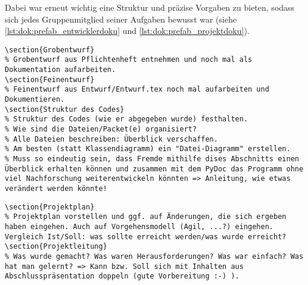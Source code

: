 Dabei war erneut wichtig eine Struktur und präzise Vorgaben zu bieten, sodass sich jedes Gruppenmitglied seiner Aufgaben bewusst war (siehe \autoref{lst:dok:prefab_entwicklerdoku} und \autoref{lst:dok:prefab_projektdoku}).

\begin{lstlisting}[language={[LaTeX]TeX}, label=lst:dok:prefab_entwicklerdoku, caption=Auszug der Vorlage der Entwicklerdokumentation]
% Anmerkung: Entwicklerdokumentation = Programmiererdokumentation (Pflichtenheft /DA2/)
\section{Grobentwurf}
% Grobentwurf aus Pflichtenheft entnehmen und noch mal als Dokumentation aufarbeiten.
\section{Feinentwurf}
% Feinentwurf aus Entwurf/Entwurf.tex noch mal aufarbeiten und Dokumentieren.
\section{Struktur des Codes}
% Struktur des Codes (wie er abgegeben wurde) festhalten. 
% Wie sind die Dateien/Packet(e) organisiert?
% Alle Dateien beschreiben: Überblick verschaffen.
% Am besten (statt Klassendiagramm) ein "Datei-Diagramm" erstellen.
% Muss so eindeutig sein, dass Fremde mithilfe dises Abschnitts einen Überblick erhalten können und zusammen mit dem PyDoc das Programm ohne viel Nachforschung weiterentwickeln könnten => Anleitung, wie etwas verändert werden könnte!
\end{lstlisting}

\begin{lstlisting}[language={[LaTeX]TeX}, label=lst:dok:prefab_projektdoku, caption=Auszug der Vorlage der Projektdokumentation]
\section{Projektplan}
% Projektplan vorstellen und ggf. auf Änderungen, die sich ergeben haben eingehen. Auch auf Vorgehensmodell (Agil, ...?) eingehen. Vergleich Ist/Soll: was sollte erreicht werden/was wurde erreicht?
\section{Projektleitung}
% Was wurde gemacht? Was waren Herausforderungen? Was war einfach? Was hat man gelernt? => Kann bzw. Soll sich mit Inhalten aus Abschlusspräsentation doppeln (gute Vorbereitung :-) ).
\end{lstlisting}

